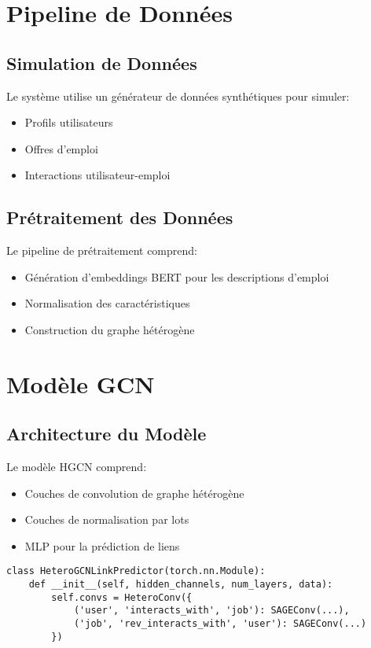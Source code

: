 \documentclass[12pt,a4paper]{article}
\begin{document}
\section{Pipeline de Données}
\subsection{Simulation de Données}
Le système utilise un générateur de données synthétiques pour simuler:
\begin{itemize}
    \item Profils utilisateurs
    \item Offres d'emploi
    \item Interactions utilisateur-emploi
\end{itemize}

\subsection{Prétraitement des Données}
Le pipeline de prétraitement comprend:
\begin{itemize}
    \item Génération d'embeddings BERT pour les descriptions d'emploi
    \item Normalisation des caractéristiques
    \item Construction du graphe hétérogène
\end{itemize}

\section{Modèle GCN}
\subsection{Architecture du Modèle}
Le modèle HGCN comprend:
\begin{itemize}
    \item Couches de convolution de graphe hétérogène
    \item Couches de normalisation par lots
    \item MLP pour la prédiction de liens
\end{itemize}

\begin{lstlisting}[caption=Architecture du Modèle GCN]
class HeteroGCNLinkPredictor(torch.nn.Module):
    def __init__(self, hidden_channels, num_layers, data):
        self.convs = HeteroConv({
            ('user', 'interacts_with', 'job'): SAGEConv(...),
            ('job', 'rev_interacts_with', 'user'): SAGEConv(...)
        })
\end{lstlisting}
\end{document}
